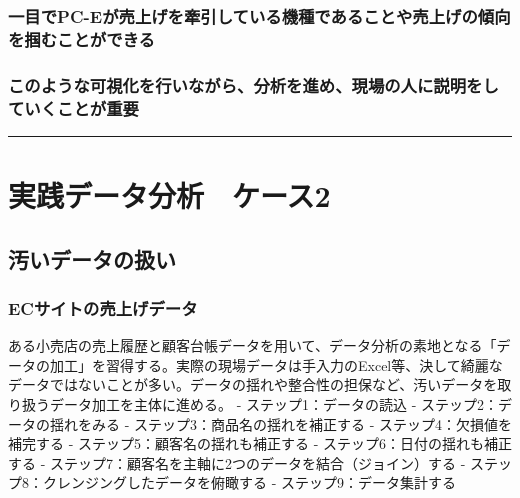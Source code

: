 \documentclass[11pt]{article}
\begin{document}
    \subsubsection{一目でPC-Eが売上げを牽引している機種であることや売上げの傾向を掴むことができる}\label{ux4e00ux76eeux3067pc-eux304cux58f2ux4e0aux3052ux3092ux727dux5f15ux3057ux3066ux3044ux308bux6a5fux7a2eux3067ux3042ux308bux3053ux3068ux3084ux58f2ux4e0aux3052ux306eux50beux5411ux3092ux63b4ux3080ux3053ux3068ux304cux3067ux304dux308b}

\subsubsection{このような可視化を行いながら、分析を進め、現場の人に説明をしていくことが重要}\label{ux3053ux306eux3088ux3046ux306aux53efux8996ux5316ux3092ux884cux3044ux306aux304cux3089ux5206ux6790ux3092ux9032ux3081ux73feux5834ux306eux4ebaux306bux8aacux660eux3092ux3057ux3066ux3044ux304fux3053ux3068ux304cux91cdux8981}

    \begin{center}\rule{0.5\linewidth}{\linethickness}\end{center}

    \section{実践データ分析　ケース2}\label{ux5b9fux8df5ux30c7ux30fcux30bfux5206ux6790ux30b1ux30fcux30b92}

\subsection{汚いデータの扱い}\label{ux6c5aux3044ux30c7ux30fcux30bfux306eux6271ux3044}

\subsubsection{ECサイトの売上げデータ}\label{ecux30b5ux30a4ux30c8ux306eux58f2ux4e0aux3052ux30c7ux30fcux30bf}

ある小売店の売上履歴と顧客台帳データを用いて、データ分析の素地となる「データの加工」を習得する。実際の現場データは手入力のExcel等、決して綺麗なデータではないことが多い。データの揺れや整合性の担保など、汚いデータを取り扱うデータ加工を主体に進める。
- ステップ1：データの読込 - ステップ2：データの揺れをみる -
ステップ3：商品名の揺れを補正する - ステップ4：欠損値を補完する -
ステップ5：顧客名の揺れも補正する - ステップ6：日付の揺れも補正する -
ステップ7：顧客名を主軸に2つのデータを結合（ジョイン）する -
ステップ8：クレンジングしたデータを俯瞰する - ステップ9：データ集計する
\end{document}
